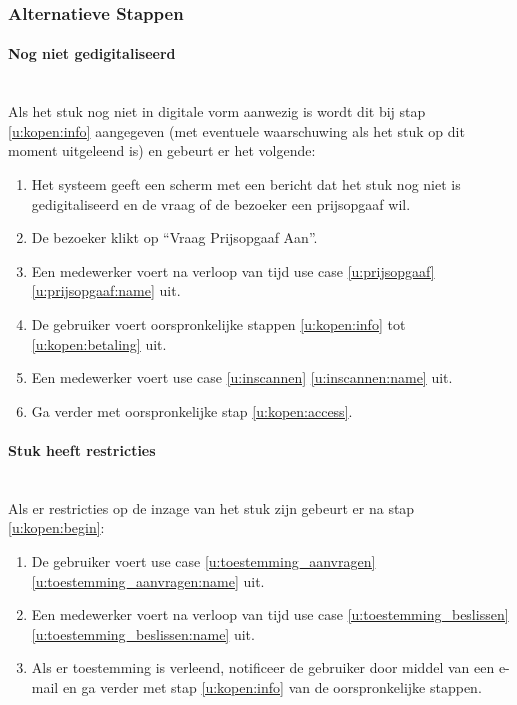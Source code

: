 \documentclass[a4paper,titlepage]{report}
\def\namedref#1{\ref{#1} \ref{#1:name}}
\begin{document}
      \subsubsection{Alternatieve Stappen}
        \paragraph{Nog niet gedigitaliseerd}\hfill\\
          Als het stuk nog niet in digitale vorm aanwezig is wordt dit bij
          stap \ref{u:kopen:info} aangegeven (met eventuele waarschuwing als
          het stuk op dit moment uitgeleend is) en gebeurt er het volgende:

          \begin{enumerate}
            \item Het systeem geeft een scherm met een bericht dat het stuk
            nog niet is gedigitaliseerd en de vraag of de bezoeker een
            prijsopgaaf wil.
            \item De bezoeker klikt op ``Vraag Prijsopgaaf Aan''.
            \item Een medewerker voert na verloop van tijd use case
              \namedref{u:prijsopgaaf} uit.
            \item De gebruiker voert oorspronkelijke stappen
              \ref{u:kopen:info} tot \ref{u:kopen:betaling} uit.
            \item Een medewerker voert use case \namedref{u:inscannen} uit.
            \item Ga verder met oorspronkelijke stap \ref{u:kopen:access}.
          \end{enumerate}
        \paragraph{Stuk heeft restricties}\hfill\\
          Als er restricties op de inzage van het stuk zijn gebeurt er na stap
          \ref{u:kopen:begin}:

          \begin{enumerate}
            \item De gebruiker voert use case
              \namedref{u:toestemming_aanvragen} uit.
            \item Een medewerker voert na verloop van tijd use case
            \namedref{u:toestemming_beslissen} uit.
            \item Als er toestemming is verleend, notificeer de gebruiker door
            middel van een e-mail en ga verder met stap \ref{u:kopen:info} van
            de oorspronkelijke stappen.
          \end{enumerate}
\end{document}
